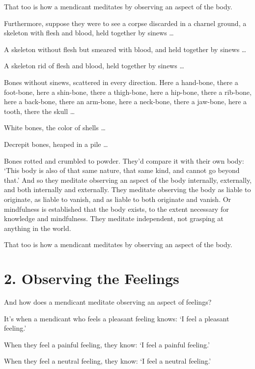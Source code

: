 \documentclass[12pt,openany]{book}%
\begin{document}
That too is how a mendicant meditates by observing an aspect of the body. 

Furthermore, suppose they were to see a corpse discarded in a charnel ground, a skeleton with flesh and blood, held together by sinews … 

A skeleton without flesh but smeared with blood, and held together by sinews … 

A skeleton rid of flesh and blood, held together by sinews … 

Bones without sinews, scattered in every direction. Here a hand-bone, there a foot-bone, here a shin-bone, there a thigh-bone, here a hip-bone, there a rib-bone, here a back-bone, there an arm-bone, here a neck-bone, there a jaw-bone, here a tooth, there the skull … 

White bones, the color of shells … 

Decrepit bones, heaped in a pile … 

Bones rotted and crumbled to powder. They’d compare it with their own body: ‘This body is also of that same nature, that same kind, and cannot go beyond that.’ And so they meditate observing an aspect of the body internally, externally, and both internally and externally. They meditate observing the body as liable to originate, as liable to vanish, and as liable to both originate and vanish. Or mindfulness is established that the body exists, to the extent necessary for knowledge and mindfulness. They meditate independent, not grasping at anything in the world. 

That too is how a mendicant meditates by observing an aspect of the body. 

\section*{2. Observing the Feelings }

And how does a mendicant meditate observing an aspect of feelings? 

It’s when a mendicant who feels a pleasant feeling knows: ‘I feel a pleasant feeling.’ 

When they feel a painful feeling, they know: ‘I feel a painful feeling.’ 

When they feel a neutral feeling, they know: ‘I feel a neutral feeling.’ 
\end{document}
